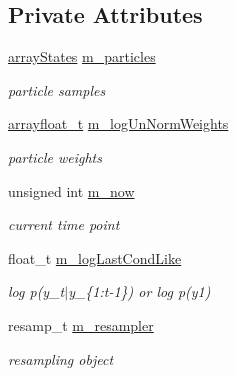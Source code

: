 \subsection*{Private Attributes}
\begin{DoxyCompactItemize}
\item 
\mbox{\label{classSISRFilter_a9a0f0fabb1f076a19aab9bf65b988cdf}} 
\hyperlink{classSISRFilter_adcfb2972e7737f4a5c5b3912bc787768}{array\+States} \hyperlink{classSISRFilter_a9a0f0fabb1f076a19aab9bf65b988cdf}{m\+\_\+particles}
\begin{DoxyCompactList}\small\item\em particle samples \end{DoxyCompactList}\item 
\mbox{\label{classSISRFilter_a95ff4488d6e6837a0d07e2e5d475bfbc}} 
\hyperlink{classSISRFilter_abe3cebcc32e298af8bcb5651d933e76d}{arrayfloat\+\_\+t} \hyperlink{classSISRFilter_a95ff4488d6e6837a0d07e2e5d475bfbc}{m\+\_\+log\+Un\+Norm\+Weights}
\begin{DoxyCompactList}\small\item\em particle weights \end{DoxyCompactList}\item 
\mbox{\label{classSISRFilter_a10d5acba4b145c392f60564e58dd3885}} 
unsigned int \hyperlink{classSISRFilter_a10d5acba4b145c392f60564e58dd3885}{m\+\_\+now}
\begin{DoxyCompactList}\small\item\em current time point \end{DoxyCompactList}\item 
\mbox{\label{classSISRFilter_ab1225f4a7eb3bdd4221b21c3f2bc9006}} 
float\+\_\+t \hyperlink{classSISRFilter_ab1225f4a7eb3bdd4221b21c3f2bc9006}{m\+\_\+log\+Last\+Cond\+Like}
\begin{DoxyCompactList}\small\item\em log p(y\+\_\+t$\vert$y\+\_\+\{1\+:t-\/1\}) or log p(y1) \end{DoxyCompactList}\item 
\mbox{\label{classSISRFilter_a0be014850653102dea6d6cf17aa9bf84}} 
resamp\+\_\+t \hyperlink{classSISRFilter_a0be014850653102dea6d6cf17aa9bf84}{m\+\_\+resampler}
\begin{DoxyCompactList}\small\item\em resampling object \end{DoxyCompactList}\item 

\end{DoxyCompactItemize}
